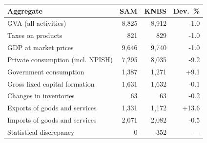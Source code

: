 \begin{tabular}{lrrr}
\toprule
Aggregate & SAM & KNBS & Dev.\ \% \\
\midrule
GVA (all activities) & 8,825 & 8,912 & -1.0 \\
Taxes on products & 821 & 829 & -1.0 \\
GDP at market prices & 9,646 & 9,740 & -1.0 \\
Private consumption (incl. NPISH) & 7,295 & 8,035 & -9.2 \\
Government consumption & 1,387 & 1,271 & +9.1 \\
Gross fixed capital formation & 1,631 & 1,632 & -0.1 \\
Changes in inventories & 63 & 63 & -0.2 \\
Exports of goods and services & 1,331 & 1,172 & +13.6 \\
Imports of goods and services & 2,071 & 2,082 & -0.5 \\
Statistical discrepancy & 0 & -352 & --- \\
\bottomrule
\end{tabular}

